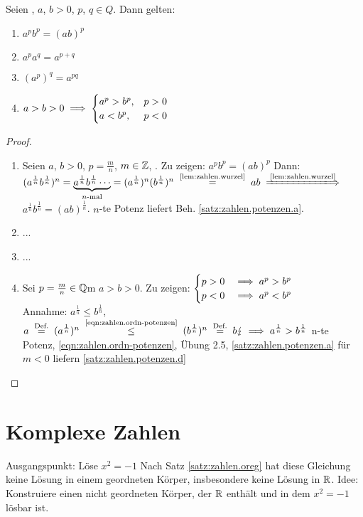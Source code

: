 \documentclass[12pt]{scrreprt}
\begin{document}
\begin{satz}\label{satz:zahlen.potenzen}
Seien , $a$, $b > 0$, $p$, $q \in {Q}$. Dann gelten:
\begin{enumerate}
\item \label{satz:zahlen.potenzen.a}
$a^p b^p = (ab)^p$
\item \label{satz:zahlen.potenzen.b}
$a^p a^q = a^{p+q}$
\item \label{satz:zahlen.potenzen.c}
$(a^p)^q = a^{pq}$
\item \label{satz:zahlen.potenzen.d}\vspace{-0.7\baselineskip}
$a>b>0 \implies \begin{cases}
a^p>b^p, &p>0\\
a<b^p, &p<0
\end{cases}$
\end{enumerate}
\end{satz}
\begin{proof}
\begin{enumerate}
\item Seien $a$, $b >0$, $p = \frac{m}{n}$, $m \in \mathbb{Z}$, .
Zu zeigen: $a^p b^p = (ab)^p$ Dann: $(a^{\frac{1}{n}}b^{\frac{1}{n}})^n =
\underbrace{a^{\frac{1}{n}}b^{\frac{1}{n}}\dotsm}_{n\text{-mal}} =
(a^{\frac{1}{n}})^n (b^{\frac{1}{n}})^n \nach{=}{\ref{lem:zahlen.wurzel}} ab \folgtnach{\ref{lem:zahlen.wurzel}} $
$a^{\frac{1}{n}}b^{\frac{1}{n}} = (ab)^{\frac{1}{n}}$. $n$-te Potenz liefert Beh. \ref{satz:zahlen.potenzen.a}.
\item ...
\item ...
\item Sei $p = \frac{m}{n} \in \mathbb{Q}$m $a>b>0$. Zu zeigen: 
$\begin{cases}
p>0 &\implies a^p > b^p\\
p<0 &\implies a^p < b^p
\end{cases}$\\
Annahme: $a^\frac{1}{n} \le b^\frac{1}{n}$, 
$a \nach{=}{Def.} (a^\frac{1}{n})^n \nach{\le}{\ref{eqn:zahlen.ordn-potenzen}} (b^\frac{1}{n})^n \nach{=}{Def.} b 
\blitz \folgt a^\frac{1}{n} > b^\frac{1}{n}$ n-te Potenz, \ref{eqn:zahlen.ordn-potenzen}, Übung 2.5, \ref{satz:zahlen.potenzen.a} 
für $m<0$ liefern \ref{satz:zahlen.potenzen.d}

\end{enumerate}
\end{proof}

\section{Komplexe Zahlen}
\label{sec:zahlen.komplex}
Ausgangspunkt: Löse $x^2 = -1$ Nach Satz \ref{satz:zahlen.oreg} hat diese Gleichung keine Lösung in einem geordneten Körper, insbesondere
keine Lösung in $\mathbb{R}$. Idee: Konstruiere einen nicht geordneten Körper, der $\mathbb{R}$ enthält und in dem $x^2 = -1$ lösbar ist. 
\end{document}
